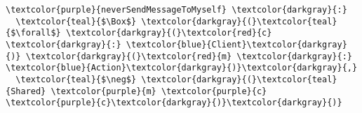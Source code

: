 \begin{Verbatim}[commandchars=\\\{\},codes={\catcode`$=3}]
  \textcolor{purple}{neverSendMessageToMyself} \textcolor{darkgray}{:}
  \textcolor{teal}{$\Box$} \textcolor{darkgray}{(}\textcolor{teal}{$\forall$} \textcolor{darkgray}{(}\textcolor{red}{c} \textcolor{darkgray}{:} \textcolor{blue}{Client}\textcolor{darkgray}{)} \textcolor{darkgray}{(}\textcolor{red}{m} \textcolor{darkgray}{:} \textcolor{blue}{Action}\textcolor{darkgray}{)}\textcolor{darkgray}{,}
  \textcolor{teal}{$\neg$} \textcolor{darkgray}{(}\textcolor{teal}{Shared} \textcolor{purple}{m} \textcolor{purple}{c} \textcolor{purple}{c}\textcolor{darkgray}{)}\textcolor{darkgray}{)}
\end{Verbatim}
